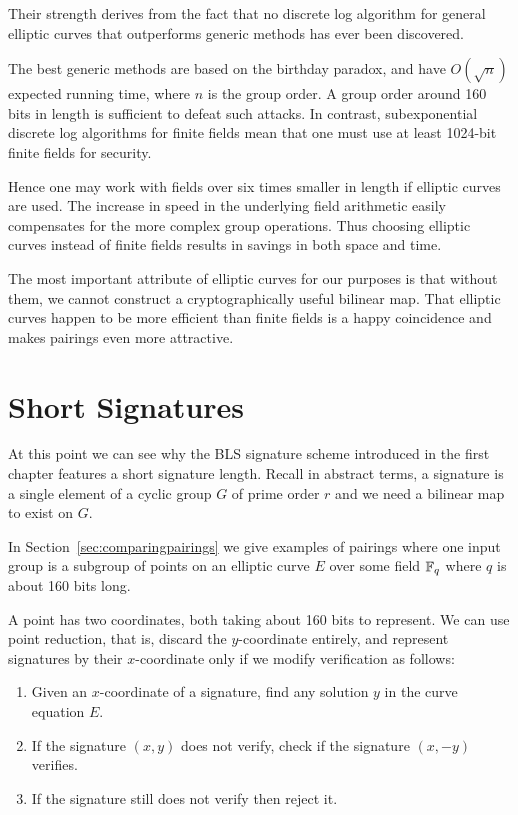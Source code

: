 Their strength derives from the fact that no discrete log algorithm for
general elliptic curves that outperforms generic methods has ever been
discovered.

The best generic methods are based on the birthday paradox, and have
$O(\sqrt{n})$ expected running time, where $n$ is the group order.
A group order around 160 bits in length is sufficient to defeat such attacks.
In contrast, subexponential discrete log algorithms for finite fields
mean that one must use at least 1024-bit finite fields for security.

Hence one may work with fields over six times smaller in length
if elliptic curves are used. The increase in speed in
the underlying field arithmetic easily compensates for the more
complex group operations. Thus choosing elliptic curves instead of
finite fields results in savings in both space and time.

The most important attribute of elliptic curves for our purposes
is that without them, we cannot construct a cryptographically
useful bilinear map. That elliptic curves happen to be more
efficient than finite fields
is a happy coincidence and makes pairings even more attractive.

\section {Short Signatures}

At this point we can see why
the BLS signature scheme introduced
in the first chapter features a short signature length.
Recall in abstract terms,
a signature is a single element of a cyclic group $G$ of prime order $r$
and we need a bilinear map to exist on $G$.

In Section~\ref{sec:comparingpairings} we give examples
of pairings where one input group is a subgroup of points
on an elliptic curve $E$ over some field $\mathbb{F}_q$ where
$q$ is about 160 bits long.

A point has two coordinates, both taking about 160 bits to represent.
We can use point reduction, that is, discard the $y$-coordinate entirely,
and represent signatures by their $x$-coordinate only if we modify
verification as follows:
\begin{enumerate}
\item
Given an $x$-coordinate of a signature, find any solution $y$
in the curve equation $E$.
\item
If the signature $(x,y)$ does not verify,
check if the signature $(x, -y)$ verifies.
\item
If the signature still does not verify then reject it.
\end{enumerate}

